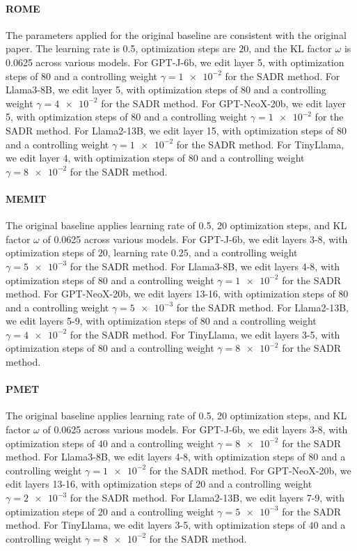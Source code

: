 \paragraph{ROME} The parameters applied for the original baseline are consistent with the original paper. The learning rate is 0.5, optimization steps are $20$, and the KL factor $\omega$ is 0.0625 across various models.
For GPT-J-6b, we edit layer 5, with optimization steps of $80$ and a controlling weight $\gamma=\num{1e-2}$ for the SADR method.
For Llama3-8B, we edit layer 5,  with optimization steps of $80$ and a controlling weight $\gamma=\num{4e-2}$ for the SADR method.
For GPT-NeoX-20b, we edit layer 5,  with optimization steps of $80$ and a controlling weight $\gamma=\num{1e-2}$ for the SADR method.
For Llama2-13B, we edit layer 15,  with optimization steps of $80$ and a controlling weight $\gamma=\num{1e-2}$ for the SADR method.
For TinyLlama, we edit layer 4, with optimization steps of $80$ and a controlling weight $\gamma=\num{8e-2}$ for the SADR method.

\paragraph{MEMIT} The original baseline applies learning rate of 0.5, 20 optimization steps, and KL factor $\omega$ of 0.0625 across various models.
For GPT-J-6b, we edit layers 3-8, with optimization steps of $20$, learning rate $0.25$, and a controlling weight $\gamma=\num{5e-3}$ for the SADR method.
For Llama3-8B, we edit layers 4-8,  with optimization steps of $80$ and a controlling weight $\gamma=\num{1e-2}$ for the SADR method.
For GPT-NeoX-20b, we edit layers 13-16,  with optimization steps of $80$ and a controlling weight $\gamma=\num{5e-3}$ for the SADR method.
For Llama2-13B, we edit layers 5-9,  with optimization steps of $80$ and a controlling weight $\gamma=\num{4e-2}$ for the SADR method.
For TinyLlama, we edit layers 3-5, with optimization steps of $80$ and a controlling weight $\gamma=\num{8e-2}$ for the SADR method.


\paragraph{PMET} The original baseline applies learning rate of 0.5, 20 optimization steps, and KL factor $\omega$ of 0.0625 across various models.
For GPT-J-6b, we edit layers 3-8, with optimization steps of $40$ and a controlling weight $\gamma=\num{8e-2}$ for the SADR method.
For Llama3-8B, we edit layers 4-8,  with optimization steps of $80$ and a controlling weight $\gamma=\num{1e-2}$ for the SADR method.
For GPT-NeoX-20b, we edit layers 13-16,  with optimization steps of $20$ and a controlling weight $\gamma=\num{2e-3}$ for the SADR method.
For Llama2-13B, we edit layers 7-9,  with optimization steps of $20$ and a controlling weight $\gamma=\num{5e-3}$ for the SADR method.
For TinyLlama, we edit layers 3-5, with optimization steps of $40$ and a controlling weight $\gamma=\num{8e-2}$ for the SADR method.

